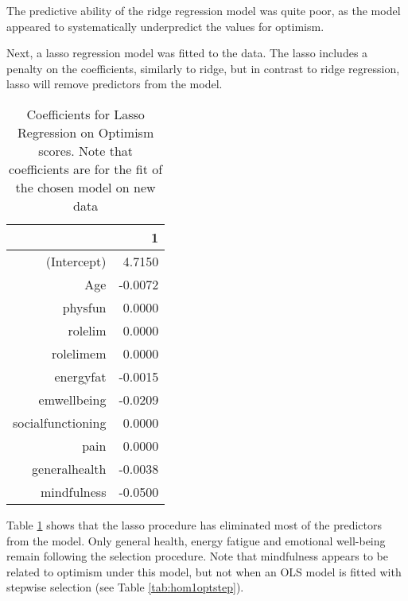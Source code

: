 \documentclass{article}
\begin{document}
The predictive ability of the ridge regression model was quite poor, as the model appeared to systematically underpredict the values for optimism. 

Next, a lasso regression model was fitted to the data. The lasso includes a penalty on the coefficients, similarly to ridge, but in contrast to ridge regression, lasso will remove predictors from the model.

\begin{table}[ht]
\centering
\begin{tabular}{rr}
  \hline
 & 1 \\ 
  \hline
(Intercept) & 4.7150 \\ 
  Age & -0.0072 \\ 
  physfun & 0.0000 \\ 
  rolelim & 0.0000 \\ 
  rolelimem & 0.0000 \\ 
  energyfat & -0.0015 \\ 
  emwellbeing & -0.0209 \\ 
  socialfunctioning & 0.0000 \\ 
  pain & 0.0000 \\ 
  generalhealth & -0.0038 \\ 
  mindfulness & -0.0500 \\ 
   \hline
\end{tabular}
\caption{Coefficients for Lasso Regression on Optimism scores. Note that coefficients are for the fit of the chosen model on new data} 
\label{tab:hom1optlasso}
\end{table}
Table \ref{tab:hom1optlasso} shows that the lasso procedure has eliminated most of the predictors from the model. Only general health, energy fatigue and emotional well-being remain following the selection procedure. Note that mindfulness appears to be related to optimism under this model, but not when an OLS model is fitted with stepwise selection (see Table \ref{tab:hom1optstep}). %








\end{document}
